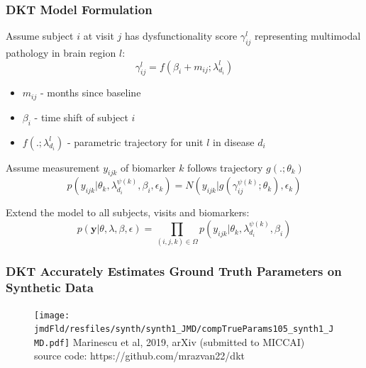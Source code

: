 \documentclass[8pt,xcolor=table]{beamer}
\begin{document}
\newcommand{\lp}{\lambda_{d_i}^{\psi(k)}}
\newcommand{\lpuu}{\lambda_{d_i}^{\psi(k),(u)}}
\newcommand{\lpum}{\lambda_{d_i}^{\psi(k),(u-1)}}

\begin{frame}[label=current]
\frametitle{DKT Model Formulation}

Assume subject $i$ at visit $j$ has dysfunctionality score $\gamma_{ij}^l$ representing multimodal pathology in brain region $l$:
\begin{equation}
 \gamma_{ij}^l = f(\beta_i + m_{ij}; \lambda_{d_i}^l)
\end{equation}
\small{
\begin{itemize}
 \item $m_{ij}$ - months since baseline
 \item $\beta_i$ - time shift of subject $i$
 \item $f(.; \lambda_{d_i}^l)$ - parametric trajectory for unit $l$ in disease $d_i$
\end{itemize}
}

\vfill 

\normalsize{
Assume measurement $y_{ijk}$ of biomarker $k$ follows trajectory $g(.; \theta_k)$
\begin{equation}
 p(y_{ijk}|\theta_k, \lp, \beta_i, \epsilon_k) = N(y_{ijk}| g( \gamma_{ij}^{\psi(k)} ; \theta_k), \epsilon_k)
\end{equation}

\vfill 

Extend the model to all subjects, visits and biomarkers:
\begin{equation}
 p(\boldsymbol{y}|\theta, \lambda, \beta , \epsilon) = \prod_{(i,j,k) \in \Omega} p(y_{ijk}|\theta_k, \lp, \beta_i)
\end{equation}
}

\end{frame}


\newcommand{\expFld}{\jointModellingDiseaseLoc/resfiles/tad-drcTiny_JMD}
\newcommand{\jmdFld}{\jointModellingDiseaseLoc}

\begin{frame}[label=current]
\frametitle{DKT Accurately Estimates Ground Truth Parameters on Synthetic Data}

\begin{figure}
\centering
\texttt{[image: \\jmdFld/resfiles/synth/synth1\_JMD/compTrueParams105\_synth1\_JMD.pdf]}
Marinescu et al, 2019, arXiv (submitted to MICCAI)\\
source code: https://github.com/mrazvan22/dkt
\end{figure}


\end{frame}
\end{document}
